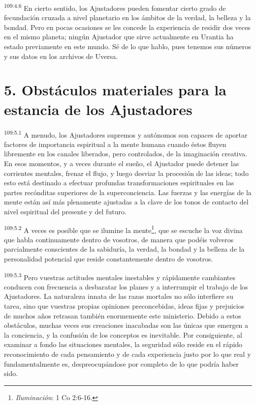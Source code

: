 \documentclass[twoside, 11pt]{book}
\begin{document}
\par
\textsuperscript{109:4.6} En cierto sentido, los Ajustadores pueden fomentar cierto grado de fecundación cruzada a nivel planetario en los ámbitos de la verdad, la belleza y la bondad. Pero en pocas ocasiones se les concede la experiencia de residir dos veces en el mismo planeta; ningún Ajustador que sirve actualmente en Urantia ha estado previamente en este mundo. Sé de lo que hablo, pues tenemos sus números y sus datos en los archivos de Uversa.

\section*{5. Obstáculos materiales para la estancia de los Ajustadores}
\par
\textsuperscript{109:5.1} A menudo, los Ajustadores supremos y autónomos son capaces de aportar factores de importancia espiritual a la mente humana cuando éstos fluyen libremente en los canales liberados, pero controlados, de la imaginación creativa. En esos momentos, y a veces durante el sueño, el Ajustador puede detener las corrientes mentales, frenar el flujo, y luego desviar la procesión de las ideas; todo esto está destinado a efectuar profundas transformaciones espirituales en las partes recónditas superiores de la superconciencia. Las fuerzas y las energías de la mente están así más plenamente ajustadas a la clave de los tonos de contacto del nivel espiritual del presente y del futuro.

\par
\textsuperscript{109:5.2} A veces es posible que se ilumine la mente\footnote{\textit{Iluminación}: 1 Co 2:6-16.}, que se escuche la voz divina que habla continuamente dentro de vosotros, de manera que podéis volveros parcialmente conscientes de la sabiduría, la verdad, la bondad y la belleza de la personalidad potencial que reside constantemente dentro de vosotros.

\par
\textsuperscript{109:5.3} Pero vuestras actitudes mentales inestables y rápidamente cambiantes conducen con frecuencia a desbaratar los planes y a interrumpir el trabajo de los Ajustadores. La naturaleza innata de las razas mortales no sólo interfiere su tarea, sino que vuestras propias opiniones preconcebidas, ideas fijas y prejuicios de muchos años retrasan también enormemente este ministerio. Debido a estos obstáculos, muchas veces sus creaciones inacabadas son las únicas que emergen a la conciencia, y la confusión de los conceptos es inevitable. Por consiguiente, al examinar a fondo las situaciones mentales, la seguridad sólo reside en el rápido reconocimiento de cada pensamiento y de cada experiencia justo por lo que real y fundamentalmente es, despreocupándose por completo de lo que podría haber sido.
\end{document}
